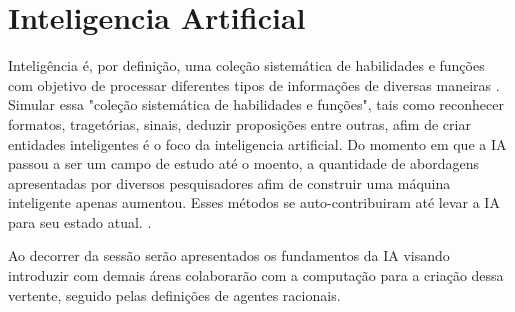 \section{Inteligencia Artificial}

Inteligência é, por definição, uma coleção sistemática de habilidades e funções com objetivo de processar diferentes tipos de informações de diversas maneiras \cite[49]{guilford1982cognitive}. Simular essa "coleção sistemática de habilidades e funções", tais como reconhecer formatos, tragetórias, sinais, deduzir proposições entre outras, afim de criar entidades inteligentes é o foco da inteligencia artificial. Do momento em que a IA passou a ser um campo de estudo até o moento, a quantidade de abordagens apresentadas por diversos pesquisadores afim de construir uma máquina inteligente apenas aumentou. Esses métodos se auto-contribuiram até levar a IA para seu estado atual. \cite[1-2]{russell2003artificial}.

Ao decorrer da sessão serão apresentados os fundamentos da IA visando introduzir com demais áreas colaborarão com a computação para a criação dessa vertente, seguido pelas definições de agentes racionais.



